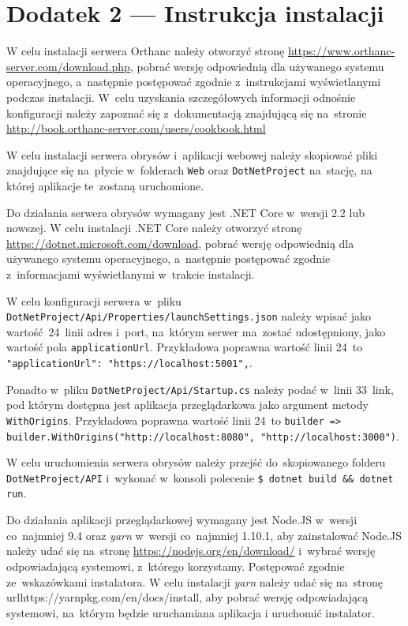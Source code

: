 \documentclass[a4paper,11pt,twoside,openright]{report}
\theoremstyle{definition}
\begin{document}
\chapter*{Dodatek 2 --- Instrukcja instalacji}

W celu instalacji serwera Orthanc należy otworzyć stronę
\url{https://www.orthanc-server.com/download.php}, pobrać wersję odpowiednią dla
używanego systemu operacyjnego, a~następnie postępować zgodnie z~instrukcjami
wyświetlanymi podczas instalacji. W~celu uzyskania szczegółowych informacji
odnośnie konfiguracji należy zapoznać się z~dokumentacją znajdującą się na~stronie
\url{http://book.orthanc-server.com/users/cookbook.html}

W celu instalacji serwera obrysów i~aplikacji webowej należy skopiować pliki
znajdujące się na~płycie w~folderach \texttt{Web} oraz \texttt{DotNetProject} na~stację,
na której aplikacje te~zostaną uruchomione.

Do działania serwera obrysów wymagany jest .NET Core w~wersji 2.2 lub nowszej.
W celu instalacji .NET Core należy otworzyć stronę \url{https://dotnet.microsoft.com/download},
pobrać wersję odpowiednią dla używanego systemu operacyjnego, a~następnie
postępować zgodnie z~informacjami wyświetlanymi w~trakcie instalacji.

W celu konfiguracji serwera w~pliku \texttt{DotNetProject/Api/Properties/launchSettings.json}
należy wpisać jako wartość~24~linii adres i~port, na~którym serwer ma~zostać
udostępniony, jako wartość pola \texttt{applicationUrl}. Przykładowa poprawna wartość
linii 24~to\texttt{ "applicationUrl": "https://localhost:5001",}.

Ponadto w~pliku \texttt{DotNetProject/Api/Startup.cs} należy podać w~linii 33~link, pod
którym dostępna jest aplikacja przeglądarkowa jako argument metody \texttt{WithOrigins}.
Przykładowa poprawna wartość linii 24~to
\texttt{builder => builder.WithOrigins("http://localhost:8080", "http://localhost:3000")}.

W celu uruchomienia serwera obrysów należy przejść do~skopiowanego folderu
\texttt{DotNetProject/API} i~wykonać w~konsoli polecenie \texttt{\$ dotnet build \&\& dotnet run}.

Do działania aplikacji przeglądarkowej wymagany jest Node.JS w~wersji co~najmniej
9.4 oraz \textit{yarn} w~wersji co~najmniej 1.10.1, aby zainstalować Node.JS należy udać
się na~stronę \url{https://nodejs.org/en/download/} i~wybrać wersję odpowiadającą
systemowi, z~którego korzystamy. Postępować zgodnie ze~wskazówkami instalatora.
W celu instalacji \textit{yarn} należy udać się na~stronę url{https://yarnpkg.com/en/docs/install},
aby pobrać wersję odpowiadającą systemowi, na~którym będzie uruchamiana aplikacja
i uruchomić instalator.
\end{document}
